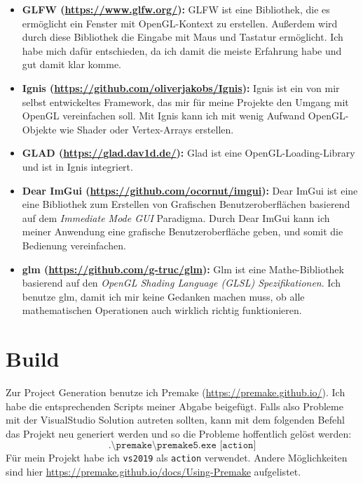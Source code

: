 \documentclass[a4paper,12pt]{article}
\begin{document}
\begin{itemize}
	\item \textbf{GLFW (\url{https://www.glfw.org/}):}
	GLFW ist eine Bibliothek, die es ermöglicht ein Fenster mit OpenGL-Kontext zu erstellen. 
	Außerdem wird durch diese Bibliothek die Eingabe mit Maus und Tastatur ermöglicht.
	Ich habe mich dafür entschieden, da ich damit die meiste Erfahrung habe und gut damit klar komme.
	\item \textbf{Ignis (\url{https://github.com/oliverjakobs/Ignis}):}
	Ignis ist ein von mir selbst entwickeltes Framework, das mir für meine Projekte den Umgang mit OpenGL vereinfachen soll. 
	Mit Ignis kann ich mit wenig Aufwand OpenGL-Objekte wie Shader oder Vertex-Arrays erstellen.
	\item \textbf{GLAD (\url{https://glad.dav1d.de/}):} 
	Glad ist eine OpenGL-Loading-Library und ist in Ignis integriert.
	\item \textbf{Dear ImGui (\url{https://github.com/ocornut/imgui}):}
	Dear ImGui ist eine eine Bibliothek zum Erstellen von Grafischen Benutzeroberflächen basierend auf dem \emph{Immediate Mode GUI} Paradigma.
	Durch Dear ImGui kann ich meiner Anwendung eine grafische Benutzeroberfläche geben, und somit die Bedienung vereinfachen.
	\item \textbf{glm (\url{https://github.com/g-truc/glm}):}
	Glm ist eine Mathe-Bibliothek basierend auf den \emph{OpenGL Shading Language (GLSL) Spezifikationen}. 
	Ich benutze glm, damit ich mir keine Gedanken machen muss, ob alle mathematischen Operationen auch wirklich richtig funktionieren. 
\end{itemize}

\section*{Build}

Zur Project Generation benutze ich Premake (\url{https://premake.github.io/}). Ich habe die entsprechenden Scripts meiner Abgabe beigefügt.
Falls also Probleme mit der VisualStudio Solution autreten sollten,
kann mit dem folgenden Befehl das Projekt neu generiert werden und so die Probleme hoffentlich gelöst werden:
\[\texttt{.\textbackslash premake\textbackslash premake5.exe [action]}\]
Für mein Projekt habe ich \texttt{vs2019} als \texttt{action} verwendet. Andere Möglichkeiten sind hier \url{https://premake.github.io/docs/Using-Premake} aufgelistet.
\end{document}
